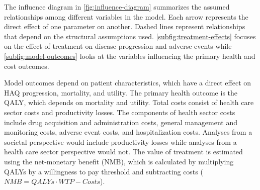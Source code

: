 \documentclass[11pt,final,fleqn]{article}\usepackage[]{graphicx}\usepackage[]{color}
\theoremstyle{plain}
\begin{document}
The influence diagram in \autoref{fig:influence-diagram} summarizes the assumed relationships among different variables in the model. Each arrow represents the direct effect of one parameter on another. Dashed lines represent relationships that depend on the structural assumptions used. \autoref{subfig:treatment-effects} focuses on the effect of treatment on disease progression and adverse events while \autoref{subfig:model-outcomes} looks at the variables influencing the primary health and cost outcomes. 

Model outcomes depend on patient characteristics, which have a direct effect on HAQ progression, mortality, and utility. The primary health outcome is the QALY, which depends on mortality and utility. Total costs consist of health care sector costs and productivity losses. The components of health sector costs include drug acquisition and administration costs, general management and monitoring costs, adverse event costs, and hospitalization costs. Analyses from a societal perspective would include productivity losses while analyses from a health care sector perspective would not. The value of treatment is estimated using the net-monetary benefit (NMB), which is calculated by multiplying QALYs by a willingness to pay threshold and subtracting costs ($NMB = QALYs \cdot WTP - Costs$). 
\end{document}
